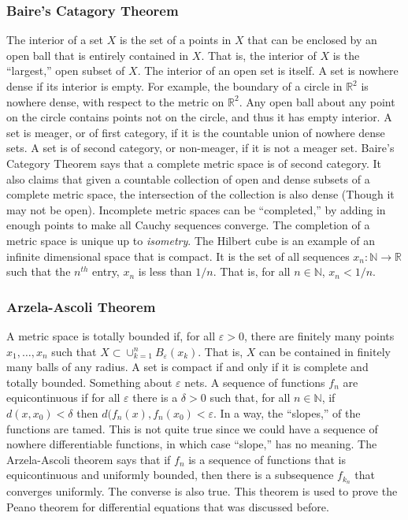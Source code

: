 \documentclass[crop=false,class=article,oneside]{standalone}
\begin{document}
        \subsubsection{Baire's Catagory Theorem}
            The interior of a set $X$ is the set of a points in $X$
            that can be enclosed by an open ball that is
            entirely contained in $X$. That is, the interior of
            $X$ is the ``largest,'' open subset of $X$. The interior
            of an open set is itself. A set is nowhere dense if
            its interior is empty. For example, the boundary of a circle
            in $\mathbb{R}^{2}$ is nowhere dense, with respect to
            the metric on $\mathbb{R}^{2}$. Any open ball about any point
            on the circle contains points not on the circle, and thus
            it has empty interior. A set is meager, or of first
            category, if it is the countable union of nowhere dense
            sets. A set is of second category, or non-meager, if
            it is not a meager set. Baire's Category Theorem says that
            a complete metric space is of second category. It also claims
            that given a countable collection of open and dense subsets
            of a complete metric space, the intersection of the collection
            is also dense (Though it may not be open). Incomplete
            metric spaces can be ``completed,'' by adding in enough
            points to make all Cauchy sequences converge. The
            completion of a metric space is unique up to
            \textit{isometry}. The Hilbert cube is an example of
            an infinite dimensional space that is compact.
            It is the set of all sequences
            $x_{n}:\mathbb{N}\rightarrow\mathbb{R}$ such that the
            $n^{th}$ entry, $x_{n}$ is less than $1/n$. That is,
            for all $n\in\mathbb{N}$, $x_{n}<1/n$.
        \subsubsection{Arzela-Ascoli Theorem}
            A metric space is totally bounded if,
            for all $\varepsilon>0$, there are
            finitely many points $x_{1},\hdots,x_{n}$ such that
            $X\subset\cup_{k=1}^{n}B_{\varepsilon}(x_{k})$. That is,
            $X$ can be contained in finitely many balls of any radius.
            A set is compact if and only if it is complete and
            totally bounded. Something about $\varepsilon$ nets.
            A sequence of functions $f_{n}$ are equicontinuous if
            for all $\varepsilon$ there is a $\delta>0$ such that,
            for all $n\in\mathbb{N}$, if $d(x,x_{0})<\delta$ then
            $d(f_{n}(x),f_{n}(x_{0})<\varepsilon$. In a way, the
            ``slopes,'' of the functions are tamed. This is not quite
            true since we could have a sequence of nowhere differentiable
            functions, in which case ``slope,'' has no meaning.
            The Arzela-Ascoli theorem says that if $f_{n}$ is a sequence
            of functions that is equicontinuous and uniformly bounded,
            then there is a subsequence $f_{k_{n}}$ that converges
            uniformly. The converse is also true. This theorem is used
            to prove the Peano theorem for differential equations that
            was discussed before.
\end{document}
